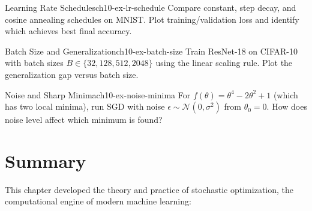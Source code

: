 \documentclass[../../main.tex]{subfiles}
\begin{document}
\begin{exercise}{Learning Rate Schedules}{ch10-ex-lr-schedule}
Compare constant, step decay, and cosine annealing schedules on MNIST. Plot training/validation loss and identify which achieves best final accuracy.
\end{exercise}

\begin{exercise}{Batch Size and Generalization}{ch10-ex-batch-size}
Train ResNet-18 on CIFAR-10 with batch sizes $B \in \{32, 128, 512, 2048\}$ using the linear scaling rule. Plot the generalization gap versus batch size.
\end{exercise}

\begin{exercise}{Noise and Sharp Minima}{ch10-ex-noise-minima}
For $f(\theta) = \theta^4 - 2\theta^2 + 1$ (which has two local minima), run SGD with noise $\epsilon \sim \mathcal{N}(0, \sigma^2)$ from $\theta_0 = 0$. How does noise level affect which minimum is found?
\end{exercise}

\section{Summary}
\label{sec:ch10-summary}

This chapter developed the theory and practice of stochastic optimization, the computational engine of modern machine learning:
\end{document}
